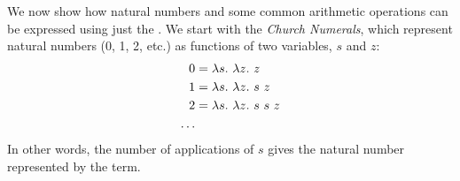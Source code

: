 \documentclass[12pt]{report}
\begin{document}





We now show how natural numbers and some common arithmetic operations
can be expressed using just the \lamA. We start with the \emph{Church
  Numerals}, which represent natural numbers (0, 1, 2, etc.) as functions
of two variables, $s$ and $z$:
\begin{equation}
  \begin{split}
    0 &= \lambda s.\ \lambda z.\ z \\
    1 &= \lambda s.\ \lambda z.\ s\ z \\
    2 &= \lambda s.\ \lambda z.\ s\ s\ z \\
    \ldots
  \end{split}
  \label{lang_eq_nats}
\end{equation}
In other words, the number of applications of $s$ gives the natural
number represented by the term. 
\end{document}
